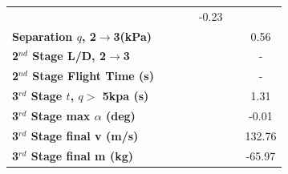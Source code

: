 \begin{table}[ht]
\begin{tabular}{l c c c c c c}
		& \secondthirdSeparationgammaTThreeStandardNoReturn
		& \secondthirdSeparationgammaTThreeOneHundredFiveNoReturn
		& \secondthirdSeparationgammaTThreeOneHundredTenNoReturn
		&-0.23
		\\
		\textbf{Separation $q$, 2$\rightarrow$3(kPa)}
		& \secondthirdSeparationqTThreeNinetyNoReturn
		& \secondthirdSeparationqTThreeNinetyFiveNoReturn
		& \secondthirdSeparationqTThreeStandardNoReturn
		& \secondthirdSeparationqTThreeOneHundredFiveNoReturn
		& \secondthirdSeparationqTThreeOneHundredTenNoReturn
		&0.56
		\\
		\textbf{2$^{nd}$ Stage L/D, 2$\rightarrow$3}
		& \secondthirdSeparationLDTThreeNinetyNoReturn
		& \secondthirdSeparationLDTThreeNinetyFiveNoReturn
		& \secondthirdSeparationLDTThreeStandardNoReturn
		& \secondthirdSeparationLDTThreeOneHundredFiveNoReturn
		& \secondthirdSeparationLDTThreeOneHundredTenNoReturn
		& -
		\\
		\textbf{2$^{nd}$ Stage Flight Time (s)}
		& \secondFlightTimeTThreeNinetyNoReturn
		& \secondFlightTimeTThreeNinetyFiveNoReturn
		& \secondFlightTimeTThreeStandardNoReturn
		& \secondFlightTimeTThreeOneHundredFiveNoReturn
		& \secondFlightTimeTThreeOneHundredTenNoReturn
		& -
		\\
		\textbf{3$^{rd}$ Stage $t$, $q >$ 5kpa (s)}
		& \thirdqOverFiveTThreeNinetyNoReturn
		& \thirdqOverFiveTThreeNinetyFiveNoReturn
		& \thirdqOverFiveTThreeStandardNoReturn
		& \thirdqOverFiveTThreeOneHundredFiveNoReturn
		& \thirdqOverFiveTThreeOneHundredTenNoReturn
		&1.31
		\\
		\textbf{3$^{rd}$ Stage max $\alpha$ (deg)}
		& \thirdmaxAoATThreeNinetyNoReturn
		& \thirdmaxAoATThreeNinetyFiveNoReturn
		& \thirdmaxAoATThreeStandardNoReturn
		& \thirdmaxAoATThreeOneHundredFiveNoReturn
		& \thirdmaxAoATThreeOneHundredTenNoReturn
		&-0.01
		\\
		\textbf{3$^{rd}$ Stage final v (m/s)}
		& \thirdcircvTThreeNinetyNoReturn
		& \thirdcircvTThreeNinetyFiveNoReturn
		& \thirdcircvTThreeStandardNoReturn
		& \thirdcircvTThreeOneHundredFiveNoReturn
		& \thirdcircvTThreeOneHundredTenNoReturn
		&132.76
		\\
		\textbf{3$^{rd}$ Stage final m (kg)}
		& \thirdcircmTThreeNinetyNoReturn
		& \thirdcircmTThreeNinetyFiveNoReturn
		& \thirdcircmTThreeStandardNoReturn
		& \thirdcircmTThreeOneHundredFiveNoReturn
		& \thirdcircmTThreeOneHundredTenNoReturn
		&-65.97
		\\
		\hline 
	\end{tabular} 
\end{table}

